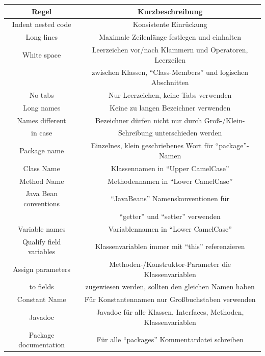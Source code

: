 \documentclass[da,ngerman]{stthesis}
\begin{document}
				\begin{center}
					\tabulinesep=1.5mm
					\begin{longtabu}{|c|c|}
						\hline
  						\textbf{Regel} & \textbf{Kurzbeschreibung}\\
  						\hline
  						Indent nested code & Konsistente Einrückung \\
  						\hline
  						Long lines & Maximale Zeilenlänge festlegen und einhalten \\
  						\hline
  						White space & Leerzeichen vor/nach Klammern und Operatoren, Leerzeilen \\ & zwischen Klassen, "`Class-Members"' und logischen Abschnitten \\
  						\hline 
  						No tabs & Nur Leerzeichen, keine Tabs verwenden \\
  						\hline
  						Long names & Keine zu langen Bezeichner verwenden \\
  						\hline
  						Names different & Bezeichner dürfen nicht nur durch Groß-/Klein- \\ in case & Schreibung unterschieden werden \\
  						\hline
  						Package name & Einzelnes, klein geschriebenes Wort für "`package"'-Namen \\
  						\hline
  						Class Name & Klassennamen in "`Upper CamelCase"' \\  							\hline
  						Method Name & Methodennamen in "`Lower CamelCase"' \\ 
  						\hline
  						Java Bean conventions & "`JavaBeans"' Namenskonventionen für \\ & "`getter"' und "`setter"' verwenden \\
  						\hline
  						Variable names & Variablennamen in "`Lower CamelCase"' \\ 
  						\hline
  						Qualify field variables & Klassenvariablen immer mit "`this"' referenzieren \\
  						\hline
  						Assign parameters & Methoden-/Konstruktor-Parameter die Klassenvariablen \\ to fields & zugewiesen werden, sollten den gleichen Namen haben \\
  						\hline
  						Constant Name & Für Konstantennamen nur Großbuchstaben verwenden \\
  						\hline
  						Javadoc & Javadoc für alle Klassen, Interfaces, Methoden, Klassenvariablen \\
  						\hline
  						Package documentation & Für alle "`packages"' Kommentardatei schreiben \\

\end{longtabu}
\end{center}
\end{document}
